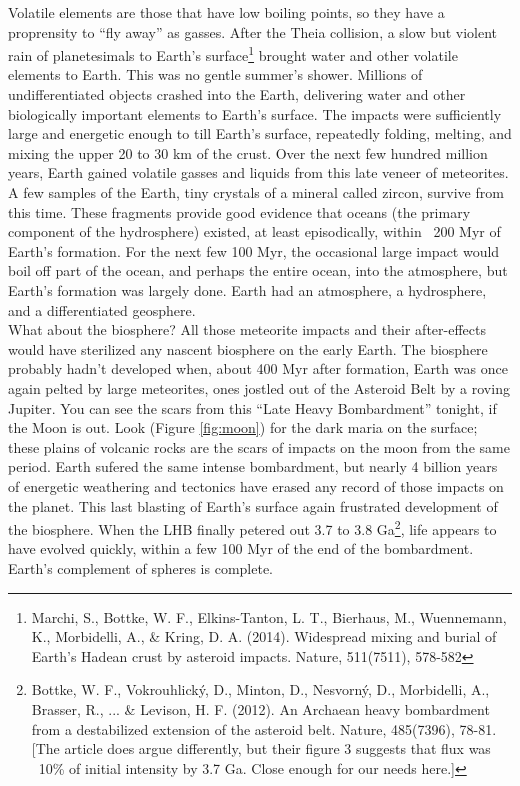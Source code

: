 \documentclass[amstex,12pt]{book}
\begin{document}
Volatile elements are those that have low boiling points, so they have a proprensity to ``fly away'' as gasses. After the Theia collision, a slow but violent rain of planetesimals to Earth's surface\footnote{Marchi, S., Bottke, W. F., Elkins-Tanton, L. T., Bierhaus, M., Wuennemann, K., Morbidelli, A., \& Kring, D. A. (2014). Widespread mixing and burial of Earth's Hadean crust by asteroid impacts. Nature, 511(7511), 578-582} brought water and other volatile elements to Earth. This was no gentle summer’s shower. Millions of undifferentiated objects crashed into the Earth, delivering water and other biologically important elements to Earth's surface. The impacts were sufficiently large and energetic enough to till Earth's surface, repeatedly folding, melting, and mixing the upper 20 to 30 km of the crust. Over the next few hundred million years, Earth gained volatile gasses and liquids from this late veneer of meteorites. A few samples of the Earth, tiny crystals of a mineral called zircon, survive from this time. These fragments provide good evidence that oceans (the primary component of the hydrosphere) existed, at least episodically, within ~200 Myr of Earth’s formation. For the next few 100 Myr, the occasional large impact would boil off part of the ocean, and perhaps the entire ocean, into the atmosphere, but Earth's formation was largely done. Earth had an atmosphere, a hydrosphere, and a differentiated geosphere.\\
What about the biosphere? All those meteorite impacts and their after-effects would have sterilized any nascent biosphere on the early Earth. The biosphere probably hadn't developed when, about 400 Myr after formation, Earth was once again pelted by large meteorites, ones jostled out of the Asteroid Belt by a roving Jupiter. You can see the scars from this ``Late Heavy Bombardment'' tonight, if the Moon is out. Look (Figure \ref{fig:moon}) for the dark maria on the surface; these plains of volcanic rocks are the scars of impacts on the moon from the same period. Earth sufered the same intense bombardment, but nearly 4 billion years of energetic weathering and tectonics have erased any record of those impacts on the planet. This last blasting of Earth's surface again frustrated development of the biosphere. When the LHB finally petered out 3.7 to 3.8 Ga\footnote{Bottke, W. F., Vokrouhlick\'{y}, D., Minton, D., Nesvorn\'{y}, D., Morbidelli, A., Brasser, R., ... \& Levison, H. F. (2012). An Archaean heavy bombardment from a destabilized extension of the asteroid belt. Nature, 485(7396), 78-81. [The article does argue differently, but their figure 3 suggests that flux was ~10\% of initial intensity by 3.7 Ga. Close enough for our needs here.]}, life appears to have evolved quickly, within a few 100 Myr of the end of the bombardment. Earth's complement of spheres is complete.\\
\end{document}
